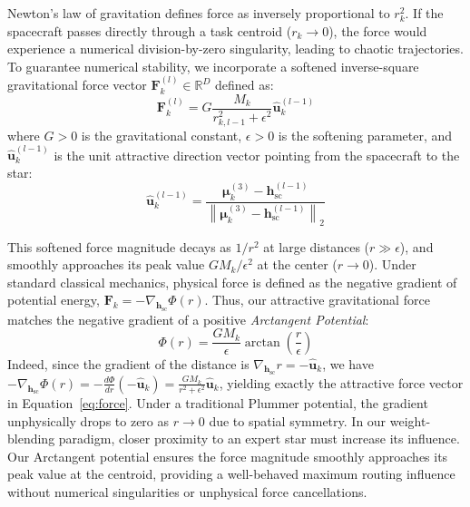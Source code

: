 Newton's law of gravitation defines force as inversely proportional to $r_k^2$. If the spacecraft passes directly through a task centroid ($r_k \to 0$), the force would experience a numerical division-by-zero singularity, leading to chaotic trajectories. To guarantee numerical stability, we incorporate a softened inverse-square gravitational force vector $\mathbf{F}_k^{(l)} \in \mathbb{R}^D$ defined as:
\vspace{-3pt}
\begin{equation}
    \mathbf{F}_k^{(l)} = G \frac{M_k}{r_{k, l-1}^2 + \epsilon^2} \hat{\mathbf{u}}_k^{(l-1)}
    \label{eq:force}
\end{equation}
\vspace{-3pt}
where $G > 0$ is the gravitational constant, $\epsilon > 0$ is the softening parameter, and $\hat{\mathbf{u}}_k^{(l-1)}$ is the unit attractive direction vector pointing from the spacecraft to the star:
\vspace{-3pt}
\begin{equation}
    \hat{\mathbf{u}}_k^{(l-1)} = \frac{\boldsymbol{\mu}_k^{(3)} - \mathbf{h}_{\text{sc}}^{(l-1)}}{\left\| \boldsymbol{\mu}_k^{(3)} - \mathbf{h}_{\text{sc}}^{(l-1)} \right\|_2}
    \label{eq:unit_vector}
\end{equation}
\vspace{-3pt}

This softened force magnitude decays as $1/r^2$ at large distances ($r \gg \epsilon$), and smoothly approaches its peak value $G M_k / \epsilon^2$ at the center ($r \to 0$). Under standard classical mechanics, physical force is defined as the negative gradient of potential energy, $\mathbf{F}_k = -\nabla_{\mathbf{h}_{\text{sc}}} \Phi(r)$. Thus, our attractive gravitational force matches the negative gradient of a positive \textit{Arctangent Potential}:
\vspace{-3pt}
\begin{equation}
    \Phi(r) = \frac{G M_k}{\epsilon} \arctan\left(\frac{r}{\epsilon}\right)
    \label{eq:arctangent_potential}
\end{equation}
\vspace{-3pt}
Indeed, since the gradient of the distance is $\nabla_{\mathbf{h}_{\text{sc}}} r = -\hat{\mathbf{u}}_k$, we have $-\nabla_{\mathbf{h}_{\text{sc}}} \Phi(r) = - \frac{d\Phi}{dr} (-\hat{\mathbf{u}}_k) = \frac{G M_k}{r^2 + \epsilon^2} \hat{\mathbf{u}}_k$, yielding exactly the attractive force vector in Equation~\ref{eq:force}. Under a traditional Plummer potential, the gradient unphysically drops to zero as $r \to 0$ due to spatial symmetry. In our weight-blending paradigm, closer proximity to an expert star must increase its influence. Our Arctangent potential ensures the force magnitude smoothly approaches its peak value at the centroid, providing a well-behaved maximum routing influence without numerical singularities or unphysical force cancellations.

